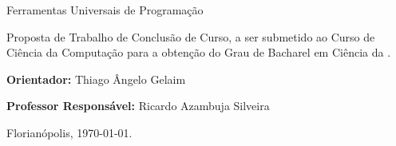 

%
%
\makeatletter
\author{Evandro Coan}\let\Author\@author
\def\Advisor{Thiago Ângelo Gelaim}
\def\Supervisor{Ricardo Azambuja Silveira}
\makeatother



\begin{titlingpage}

    \center




    \Author



    \bigskip
    Ferramentas Universais de Programação\\[3cm]

    \begin{flushright}

        \begin{minipage}{0.518\textwidth}

            Proposta de Trabalho de Conclusão de Curso,
            a ser submetido ao Curso de Ciência da Computação
            para a obtenção do Grau de Bacharel em Ciência da .

            \medskip
            {\bfseries Orientador:} \hfill \Advisor

            \medskip
            {\bfseries Professor Responsável:} \hfill \Supervisor

        \end{minipage}

    \end{flushright}


    Florianópolis, \today.

\end{titlingpage}






